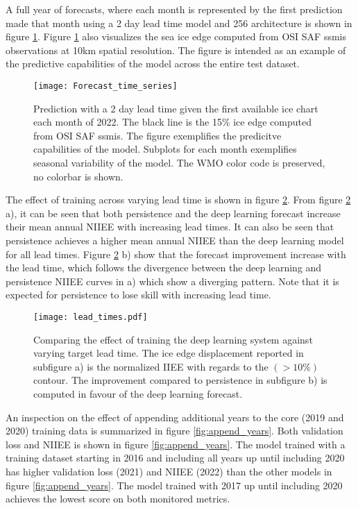 \documentclass[../main/thesis]{subfiles}
\begin{document}
A full year of forecasts, where each month is represented by the first prediction made that month using a 2 day lead time model and 256 architecture is shown in figure \ref{fig:timeseries}. Figure \ref{fig:timeseries} also visualizes the sea ice edge computed from OSI SAF ssmis observations at 10km spatial resolution. The figure is intended as an example of the predictive capabilities of the model across the entire test dataset. 

\begin{figure}
    \centering
    \texttt{[image: Forecast\_time\_series]}
    \caption{\label{fig:timeseries}Prediction with a 2 day lead time given the first available ice chart each month of 2022. The black line is the 15\% ice edge computed from OSI SAF ssmis. The figure exemplifies the predicitve capabilities of the model. Subplots for each month exemplifies seasonal variability of the model. The WMO color code is preserved, no colorbar is shown.}
\end{figure}

The effect of training across varying lead time is shown in figure \ref{fig:lead_times}. From figure \ref{fig:lead_times} a), it can be seen that both persistence and the deep learning forecast increase their mean annual NIIEE with increasing lead times. It can also be seen that persistence achieves a higher mean annual NIIEE than the deep learning model for all lead times. Figure \ref{fig:lead_times} b) show that the forecast improvement increase with the lead time, which follows the divergence between the deep learning and persistence NIIEE curves in a) which show a diverging pattern. Note that it is expected for persistence to lose skill with increasing lead time.

\begin{figure}
    \centering
    \texttt{[image: lead\_times.pdf]}
    \caption{\label{fig:lead_times}Comparing the effect of training the deep learning system against varying target lead time. The ice edge displacement reported in subfigure a) is the normalized IIEE with regards to the $(> 10\%)$ contour. The improvement compared to persistence in subfigure b) is computed in favour of the deep learning forecast.}
\end{figure}

An inspection on the effect of appending additional years to the core (2019 and 2020) training data is summarized in figure \ref{fig:append_years}. Both validation loss and NIIEE is shown in figure \ref{fig:append_years}. The model trained with a training dataset starting in 2016 and including all years up until including 2020 has higher validation loss (2021) and NIIEE (2022) than the other models in figure \ref{fig:append_years}. The model trained with 2017 up until including 2020 achieves the lowest score on both monitored metrics.
\end{document}
